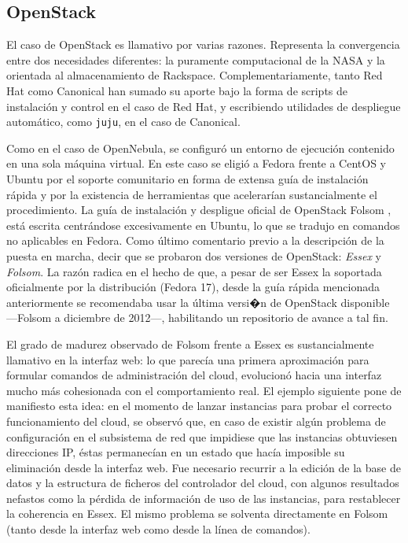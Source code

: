 \subsection{OpenStack}\label{subsec:openstack}
\noindent El caso de OpenStack es llamativo por varias razones. Representa la convergencia entre dos necesidades diferentes: la puramente computacional de la NASA y la orientada al almacenamiento de Rackspace. Complementariamente, tanto Red Hat como Canonical han sumado su aporte bajo la forma de scripts de instalaci\'on y control en el caso de Red Hat, y escribiendo utilidades de despliegue autom\'atico, como \texttt{juju}, en el caso de Canonical.\newline

Como en el caso de OpenNebula, se configur\'o un entorno de ejecuci\'on contenido en una sola m\'aquina virtual. En este caso se eligi\'o a Fedora frente a CentOS y Ubuntu por el soporte comunitario en forma de extensa gu\'ia de instalaci\'on r\'apida \cite{quickstartfedoraos} y por la existencia de herramientas que ace\-le\-ra\-r\'ian sustancialmente el procedimiento. La gu\'ia de instalaci\'on y despligue oficial de OpenStack Folsom \cite{installdeployosfolsom}, est\'a escrita centr\'andose excesivamente en Ubuntu, lo que se tradujo en comandos no aplicables en Fedora. Como \'ultimo comentario previo a la descripci\'on de la puesta en marcha, decir que se probaron dos versiones de OpenStack: \emph{Essex} y \emph{Folsom}. La raz\'on radica en el hecho de que, a pesar de ser Essex la soportada oficialmente por la distribuci\'on (Fedora 17), desde la gu\'ia r\'apida mencionada anteriormente \cite{quickstartfedoraos} se recomendaba usar la \'ultima versi�n de OpenStack disponible ---Folsom a diciembre de 2012---, habilitando un re\-po\-si\-to\-rio de avance a tal fin.\newline

El grado de madurez observado de Folsom frente a Essex es sustancialmente llamativo en la interfaz web: lo que parec\'ia una primera aproximaci\'on para formular comandos de administraci\'on del cloud, evolucion\'o hacia una interfaz mucho m\'as cohesionada con el comportamiento real. El ejemplo si\-guien\-te pone de manifiesto esta idea: en el momento de lanzar instancias para probar el correcto funcionamiento del cloud, se observ\'o que, en caso de existir alg\'un problema de configuraci\'on en el subsistema de red que impidiese que las instancias obtuviesen direcciones IP, \'estas permanec\'ian en un estado que hac\'ia imposible su eliminaci\'on desde la interfaz web. Fue necesario recurrir a la edici\'on de la base de datos y la estructura de ficheros del controlador del cloud, con algunos resultados nefastos como la p\'erdida de informaci\'on de uso de las instancias, para restablecer la coherencia en Essex. El mismo problema se solventa directamente en Folsom (tanto desde la interfaz web como desde la l\'inea de comandos).\newline

